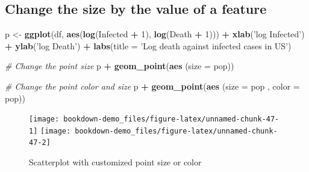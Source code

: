 \documentclass[]{book}
\newenvironment{Shaded}{\begin{snugshade}}{\end{snugshade}}
\newcommand{\KeywordTok}[1]{\textcolor[rgb]{0.13,0.29,0.53}{\textbf{#1}}}
\newcommand{\DataTypeTok}[1]{\textcolor[rgb]{0.13,0.29,0.53}{#1}}
\newcommand{\DecValTok}[1]{\textcolor[rgb]{0.00,0.00,0.81}{#1}}
\newcommand{\StringTok}[1]{\textcolor[rgb]{0.31,0.60,0.02}{#1}}
\newcommand{\CommentTok}[1]{\textcolor[rgb]{0.56,0.35,0.01}{\textit{#1}}}
\newcommand{\OperatorTok}[1]{\textcolor[rgb]{0.81,0.36,0.00}{\textbf{#1}}}
\newcommand{\NormalTok}[1]{#1}
\begin{document}
\subsection{Change the size by the value of a
feature}\label{change-the-size-by-the-value-of-a-feature}

\begin{Shaded}
\begin{Highlighting}[]
\NormalTok{p <-}\StringTok{ }\KeywordTok{ggplot}\NormalTok{(df, }\KeywordTok{aes}\NormalTok{(}\KeywordTok{log}\NormalTok{(Infected }\OperatorTok{+}\StringTok{ }\DecValTok{1}\NormalTok{), }\KeywordTok{log}\NormalTok{(Death }\OperatorTok{+}\StringTok{ }\DecValTok{1}\NormalTok{))) }\OperatorTok{+}
\StringTok{  }\KeywordTok{xlab}\NormalTok{(}\StringTok{'log Infected'}\NormalTok{) }\OperatorTok{+}
\StringTok{  }\KeywordTok{ylab}\NormalTok{(}\StringTok{'log Death'}\NormalTok{) }\OperatorTok{+}\StringTok{ }
\StringTok{  }\KeywordTok{labs}\NormalTok{(}\DataTypeTok{title =} \StringTok{'Log death against infected cases in US'}\NormalTok{)}

\CommentTok{# Change the point size}
\NormalTok{p }\OperatorTok{+}\StringTok{ }\KeywordTok{geom_point}\NormalTok{(}\KeywordTok{aes}\NormalTok{ (}\DataTypeTok{size =}\NormalTok{ pop))}

\CommentTok{# Change the point color and size}
\NormalTok{p }\OperatorTok{+}\StringTok{ }\KeywordTok{geom_point}\NormalTok{(}\KeywordTok{aes}\NormalTok{ (}\DataTypeTok{size =}\NormalTok{ pop , }\DataTypeTok{color =}\NormalTok{ pop))}
\end{Highlighting}
\end{Shaded}

\begin{figure}
\texttt{[image: bookdown-demo\_files/figure-latex/unnamed-chunk-47-1]} \texttt{[image: bookdown-demo\_files/figure-latex/unnamed-chunk-47-2]} \caption{Scatterplot with customized point size or color}\label{fig:unnamed-chunk-47}
\end{figure}
\end{document}
